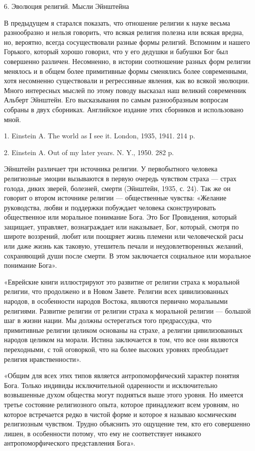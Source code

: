 6. Эволюция религий. Мысли Эйнштейна

В предыдущем я старался показать, что отношение религии к науке весьма
разнообразно и нельзя говорить, что всякая религия полезна или всякая вредна,
но, вероятно, всегда сосуществовали разные формы религий. Вспомним и нашего
Горького, который хорошо говорил, что у его дедушки и бабушки Бог был
совершенно различен. Несомненно, в истории соотношение разных форм религии
менялось и в общем более примитивные формы сменялись более современными, хотя
несомненно существовали и регрессивные явления, как во всякой эволюции. Много
интересных мыслей по этому поводу высказал наш великий современник Альберт
Эйнштейн. Его высказывания по самым разнообразным вопросам собраны в двух
сборниках. Английское издание этих сборников и использовано мной.

1. Einstein A. The world as I see it. London, 1935, 1941. 214 p.

2. Einstein A. Out of my later years. N. Y., 1950. 282 p.

Эйнштейн различает три источника религии. У первобытного человека религиозные
эмоции вызываются в первую очередь чувством страха --- страх голода, диких
зверей, болезней, смерти (Эйнштейн, 1935, с. 24). Так же он говорит о втором
источнике религии --- общественные чувства: «Желание руководства, любви и
поддержки побуждает человека сконструировать общественное или моральное
понимание Бога. Это Бог Провидения, который защищает, управляет, вознаграждает
или наказывает, Бог, который, смотря по широте воззрений, любит или поощряет
жизнь племени или человеческой расы или даже жизнь как таковую, утешитель
печали и неудовлетворенных желаний, сохраняющий души после смерти. В этом
заключается социальное или моральное понимание Бога».

«Еврейские книги иллюстрируют это развитие от религии страха к моральной
религии, что продолжено и в Новом Завете. Религии всех цивилизованных народов,
в особенности народов Востока, являются первично моральными религиями. Развитие
религии от религии страха к моральной религии --- большой шаг в жизни нации. Мы
должны остерегаться того предрассудка, что примитивные религии целиком
основаны на страхе, а религии цивилизованных народов целиком на морали. Истина
заключается в том, что все они являются переходными,
с той оговоркой, что на более высоких уровнях преобладает религия
нравственности».

«Общим для всех этих типов является антропоморфический характер понятия Бога.
Только индивиды исключительной одаренности и исключительно возвышенные духом
общества могут подняться выше этого уровня. Но имеется третье состояние
религиозного опыта, которое принадлежит всем уровням, но которое встречается
редко в чистой форме и которое я называю космическим религиозным чувством.
Трудно объяснить это ощущение тем, кто его совершенно лишен, в особенности
потому, что ему не соответствует никакого антропоморфического представления
Бога».


